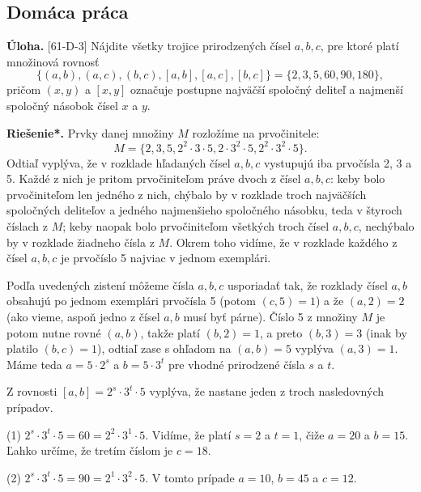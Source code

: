 \documentclass[11pt,a4paper,oneside,final]{book}
\newcommand{\ul}{\textbf{Úloha.} }
\newcommand{\rieh}{\textbf{Riešenie*.} }
\begin{document}
\subsection*{Domáca práca}
\begin{tcolorbox}[breakable,notitle,boxrule=0pt,colback=light-gray,colframe=light-gray]\ul [61-D-3]
Nájdite všetky trojice prirodzených čísel $a, b, c$, pre ktoré platí množinová rovnosť
$$\{(a, b), (a, c), (b, c), [a, b], [a, c], [b, c]\}= \{2, 3, 5, 60, 90, 180\},$$
pričom $(x, y)$ a $[x, y]$ označuje postupne najväčší spoločný deliteľ a najmenší spoločný násobok čísel $x$ a $y$.

\end{tcolorbox}

\rieh Prvky danej množiny $M$ rozložíme na prvočinitele:
$$M = \{2, 3, 5, 2^2 \cdot 3 \cdot 5, 2 \cdot 3^2 \cdot 5, 2^2 \cdot 3^2 \cdot 5\}.$$
Odtiaľ vyplýva, že v rozklade hľadaných čísel $a, b, c$ vystupujú iba prvočísla 2, 3 a 5. Každé z nich je pritom prvočiniteľom práve dvoch z čísel $a, b, c$: keby bolo prvočiniteľom len jedného z nich, chýbalo by v rozklade troch najväčších spoločných deliteľov a jedného najmenšieho spoločného násobku, teda v štyroch číslach z $M$; keby naopak bolo prvočiniteľom všetkých troch čísel $a, b, c$, nechýbalo by v rozklade žiadneho čísla z $M$. Okrem toho vidíme, že v rozklade každého z čísel $a, b, c$ je prvočíslo 5 najviac v jednom exemplári.

Podľa uvedených zistení môžeme čísla $a, b, c$ usporiadať tak, že rozklady čísel $a, b$ obsahujú po jednom exemplári prvočísla 5 (potom $(c, 5) = 1$) a že $(a, 2) = 2$ (ako vieme, aspoň jedno z čísel $a, b$ musí byť párne). Číslo 5 z množiny $M$ je potom nutne rovné $(a, b)$, takže platí $(b, 2) = 1$, a preto $(b, 3) = 3$ (inak by platilo $(b, c) = 1$), odtiaľ zase s ohľadom na $(a, b) = 5$ vyplýva $(a, 3) = 1$. Máme teda $a = 5 \cdot 2^s$ a $b = 5 \cdot 3^t$ pre vhodné prirodzené čísla $s$ a $t$.

Z rovnosti $[a, b] = 2^s \cdot3^t \cdot5$ vyplýva, že nastane jeden z troch nasledovných prípadov.

(1) $2^s \cdot 3^t \cdot 5 = 60 = 2^2 \cdot 3^1 \cdot 5$. Vidíme, že platí $s = 2$ a $t = 1$, čiže $a = 20$ a $b = 15.$ Ľahko určíme, že tretím číslom je $c = 18$.

(2) $2^s \cdot 3^t \cdot 5 = 90 = 2^1 \cdot 3^2 \cdot 5$. V tomto prípade $a = 10$, $b = 45$ a $c = 12$.
\end{document}
